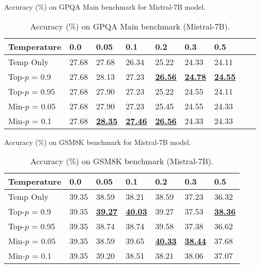 \documentclass{article}
\begin{document}
\begin{table*}[ht]
\centering
\caption{Accuracy (\%) on GPQA Main benchmark for Mistral-7B model.}
\label{tab:merged_mistral_results}
\begin{subtable}[t]{\textwidth}
\centering
\caption{Accuracy (\%) on GPQA Main benchmark (Mistral-7B).}
\begin{tabular}{lllllllll}
\toprule
Temperature & 0.0 & 0.05 & 0.1 & 0.2 & 0.3 & 0.5 \\
\midrule
Temp Only & 27.68 & 27.68 & 26.34 & 25.22 & 24.33 & 24.11 \\
Top-\(p\) = 0.9 & 27.68 & 28.13 & 27.23 & \textbf{\underline{26.56}} & \textbf{\underline{24.78}} & \textbf{\underline{24.55}} \\
Top-\(p\) = 0.95 & 27.68 & 27.90 & 27.23 & 25.22 & 24.55 & 24.11 \\
Min-\(p\) = 0.05 & 27.68 & 27.90 & 27.23 & 25.45 & 24.55 & 24.33 \\
Min-\(p\) = 0.1 & 27.68 & \textbf{\underline{28.35}} & \textbf{\underline{27.46}} & \textbf{\underline{26.56}} & 24.33 & 24.33 \\
\bottomrule
\end{tabular}
\end{subtable}
\end{table*}

\begin{table*}[ht]
\centering
\caption{Accuracy (\%) on GSM8K benchmark for Mistral-7B model.}
\begin{subtable}[t]{\textwidth}
\centering
\caption{Accuracy (\%) on GSM8K benchmark (Mistral-7B).}
\begin{tabular}{lllllll}
\toprule
Temperature & 0.0 & 0.05 & 0.1 & 0.2 & 0.3 & 0.5 \\
\midrule
Temp Only & 39.35 & 38.59 & 38.21 & 38.59 & 37.23 & 36.32 \\
Top-\(p\) = 0.9 & 39.35 & \textbf{\underline{39.27}} & \textbf{\underline{40.03}} & 39.27 & 37.53 & \textbf{\underline{38.36}} \\
Top-\(p\) = 0.95 & 39.35 & 38.74 & 38.74 & 39.58 & 37.38 & 36.62 \\
Min-\(p\) = 0.05 & 39.35 & 38.59 & 39.65 & \textbf{\underline{40.33}} & \textbf{\underline{38.44}} & 37.68 \\
Min-\(p\) = 0.1 & 39.35 & 39.20 & 38.51 & 38.21 & 38.06 & 37.07 \\
\bottomrule
\end{tabular}
\end{subtable}
\end{table*}
\end{document}
